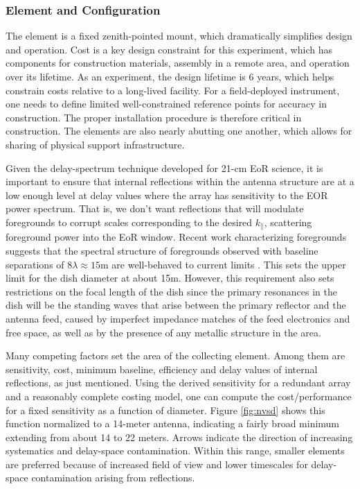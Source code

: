 \documentclass[preprint]{aastex}
\def\kpar{k_{\|}}
\def\kpar{k_{\|}}
\begin{document}
\vspace{-0.25in}
\subsubsection{Element and Configuration}
\vspace{-6pt}


The element is a fixed zenith-pointed mount, which dramatically simplifies design and
operation. Cost is a key design constraint for this experiment, which has components
for construction materials, assembly in a remote area, and operation over its
lifetime. As an experiment, the design lifetime is 6 years, which helps constrain
costs relative to a long-lived facility. For a field-deployed instrument, one needs
to define limited well-constrained reference points for accuracy in construction. The
proper installation procedure is therefore critical in construction. The elements are
also nearly abutting one another, which allows for sharing of physical support
infrastructure.

Given the delay-spectrum technique developed for 21-cm EoR science, it is important
to ensure that internal reflections within the antenna structure are at a low enough
level at delay values where the array has sensitivity to the EOR power spectrum. That
is, we don't want reflections that will modulate foregrounds to corrupt scales
corresponding to the desired $\kpar$, scattering foreground power into the EoR
window. Recent work characterizing foregrounds suggests that the spectral structure
of foregrounds observed with baseline separations of $8\lambda \approx 15$m are
well-behaved to current limits \citep{parsons_et_al2013}. This sets the upper limit
for the dish diameter at about 15m. However, this requirement also sets restrictions
on the focal length of the dish since the primary resonances in the dish will be the
standing waves that arise between the primary reflector and the antenna feed, caused
by imperfect impedance matches of the feed electronics and free space, as well as by
the presence of any metallic structure in the area.

Many competing factors set the area of the collecting element. Among them are
sensitivity, cost, minimum baseline, efficiency and delay values of internal
reflections, as just mentioned. Using the derived sensitivity for a redundant array
\citep{parsons_et_al2012a} and a reasonably complete costing model, one can compute
the cost/performance for a fixed sensitivity as a function of diameter. Figure
\ref{fig:nvsd} shows this function normalized to a 14-meter antenna, indicating a
fairly broad minimum extending from about 14 to 22 meters. Arrows indicate the
direction of increasing systematics and delay-space contamination. Within this range,
smaller elements are preferred because of increased field of view and lower
timescales for delay-space contamination arising from reflections.
\end{document}
